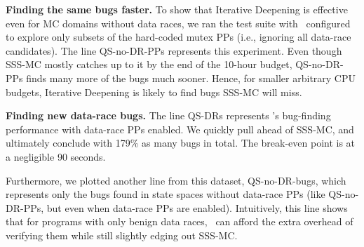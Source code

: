 {\bf Finding the same bugs faster.}
To show that Iterative Deepening is effective even for MC domains without data races, %
we ran the test suite with \quicksand~configured to explore only subsets of the hard-coded mutex PPs
(i.e., ignoring all data-race candidates).
%
The line QS-no-DR-PPs represents this experiment.
Even though SSS-MC mostly catches up to it by the end of the 10-hour budget,
QS-no-DR-PPs finds many more of the bugs much sooner.
Hence, for smaller arbitrary CPU budgets,
Iterative Deepening is likely to find bugs SSS-MC will miss.


{\bf Finding new data-race bugs.}
The line QS-DRs represents \quicksand's bug-finding performance
with data-race PPs enabled.
We quickly pull ahead of SSS-MC, and ultimately conclude with 179\% as many bugs in total.
The break-even point is at a negligible 90 seconds.

Furthermore, we plotted another line from this dataset, QS-no-DR-bugs,
which represents only the bugs found in state spaces without data-race PPs (like QS-no-DR-PPs, but even when data-race PPs are enabled).
Intuitively, this line shows that for programs with only benign data races,
\quicksand~can afford the extra overhead of verifying them while still slightly edging out SSS-MC.

